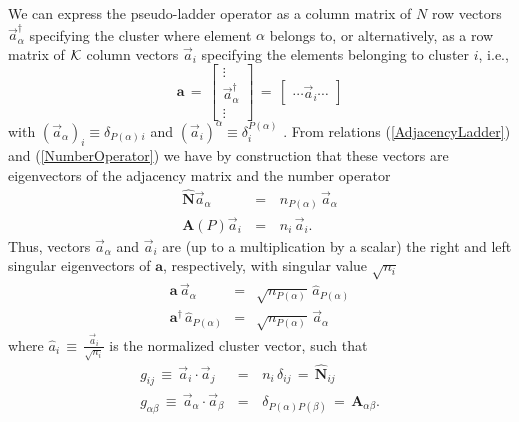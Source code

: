 \documentclass[twocolumn,aps,sort,nofootinbib]{revtex4}
\begin{document}
We can express the pseudo-ladder operator as 
a column matrix of $N$ row vectors $\overrightarrow{a}_\alpha^\dagger$ 
specifying the cluster where element $\alpha$ belongs to, 
or alternatively, as
a row matrix of $\cal{K}$ column
vectors $\overrightarrow{a}_i$ specifying the elements belonging to cluster $i$,
i.e.,
\begin{equation}
\mathbf{a}\,=\,
\begin{bmatrix}
\vdots \\
\overrightarrow{a}^{\dagger}_\alpha \\
\vdots
\end{bmatrix} 
\,=\,
\begin{bmatrix}\cdots \overrightarrow{a}_i\cdots \end{bmatrix}
\end{equation}
with 
$(\overrightarrow{a}_\alpha)_i\equiv \delta_{P(\alpha)\, i}$
and 
$(\overrightarrow{a}_i)^\alpha\equiv \delta^{P(\alpha)}_i$ 
.
From relations (\ref{AdjacencyLadder}) and (\ref{NumberOperator}) we have by construction
that these vectors are eigenvectors of the adjacency matrix and the number operator
\begin{subequations}
\label{Eigenvectors_Adjacency_Numberoperator}
\begin{eqnarray}
\mathbf{\hat{N}}\overrightarrow{a}_\alpha\,&=&\,n_{P(\alpha)}\,\overrightarrow{a}_\alpha \label{Eigen_Adj}
\\
\mathbf{A}(P)\overrightarrow{a}_i\,&=&\,n_i\,\overrightarrow{a}_i \label{Eigen_N}.
\end{eqnarray} 
\end{subequations}
Thus, vectors $\overrightarrow{a}_\alpha$ and $\overrightarrow{a}_i$ are 
(up to a multiplication by a scalar) 
the right and left singular eigenvectors of $\mathbf{a}$, respectively, with singular
value $\sqrt{n_i}$
\begin{eqnarray}
\mathbf{a}\,\overrightarrow{a}_\alpha &=& \sqrt{n_{P(\alpha)}}\,\hat{a}_{P(\alpha)} \nonumber 
\\
\mathbf{a}^\dagger\,\hat{a}_{P(\alpha)} &=& \sqrt{n_{P(\alpha)}}\,\overrightarrow{a}_\alpha 
\label{LeftRigthEigenvectors}
\end{eqnarray}
where $\hat{a}_i\,\equiv\,\frac{\overrightarrow{a}_i}{\sqrt{n_i}}$ is the normalized cluster vector,
such that
\begin{subequations}
\label{GramMatrix}
\begin{eqnarray}
g_{ij}\,\equiv\,\overrightarrow{a}_i \cdot \overrightarrow{a}_j \, &=& \,n_i\,\delta_{ij} \,=\, \mathbf{\hat{N}}_{ij} \\
g_{\alpha\beta}\,\equiv\,\overrightarrow{a}_\alpha \cdot \overrightarrow{a}_\beta\, &=& \,\delta_{P(\alpha)P(\beta)} 
\,=\, \mathbf{A}_{\alpha\beta} .
\end{eqnarray}
\end{subequations}
\end{document}
